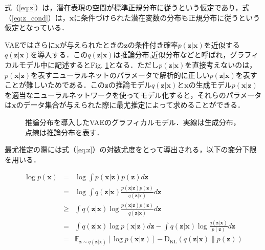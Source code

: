 式（\ref{eq:z}）は，潜在表現の空間が標準正規分布に従うという仮定であり，式（\ref{eq:z_cond}）は，$\bm{x}$に条件づけられた潜在変数の分布も正規分布に従うという仮定となっている．

VAEではさらに$\bm{x}$が与えられたときの$\bm{z}$の条件付き確率$p(\bm{z}|\bm{x})$を近似する$q(\bm{z}|\bm{x})$を導入する．この$q(\bm{z}|\bm{x})$は推論分布,近似分布などと呼ばれ，グラフィカルモデル中に記述するとFig. \ref{fig:vae_cond}となる．ただし$p(\bm{z}|\bm{x})$を直接考えないのは，$p(\bm{x}|\bm{z})$を表すニューラルネットのパラメータで解析的に正しい$p(\bm{z}|\bm{x})$を表すことが難しいためである．この$\bm{z}$の推論モデル$q(\bm{z}|\bm{x})$と$\bm{x}$の生成モデル$p(\bm{x}|\bm{z})$を適当なニューラルネットワークを使ってモデル化すると，それらのパラメータは$\bm{x}$のデータ集合が与えられた際に最尤推定によって求めることができる．

\begin{figure}[tp]
  \begin{center}
    \caption[推論分布を導入したVAEのグラフィカルモデル]{推論分布を導入したVAEのグラフィカルモデル．実線は生成分布，点線は推論分布を表す．}
    \label{fig:vae_cond}
  \end{center}
\end{figure}

最尤推定の際には式（\ref{eq:z}）の対数尤度をとって導出される，以下の変分下限を用いる．

\begin{eqnarray}
  \log p(\bm{x}) &=& \log \int p(\bm{x}|\bm{z}) p(\bm{z}) d\bm{z} \label{eq:no_replace} \\
  &=& \log \int q(\bm{z}|\bm{x}) \frac{p(\bm{x}|\bm{z}) p(\bm{z})}{q(\bm{z}|\bm{x})} d\bm{z} \label{eq:replace} \\
  &\geq& \int q(\bm{z}|\bm{x}) \log \frac{p(\bm{x}|\bm{z}) p(\bm{z})}{q(\bm{z}|\bm{x})} d\bm{z} \label{eq:jensen}\\
  &=& \int q(\bm{z}|\bm{x}) \log p(\bm{x}|\bm{z}) d\bm{z} - \int q(\bm{z}|\bm{x}) \log \frac{q(\bm{z}|\bm{x})}{p(\bm{z})} d\bm{z} \nonumber \\
  &=& \mathbb{E}_{\bm{z} \sim q(\bm{z}|\bm{x})} [\log p(\bm{x}|\bm{z})] - \mathrm{D_{KL}}(q(\bm{z}|\bm{x}) \| p(\bm{z})) \label{eq:elbo}
\end{eqnarray}


